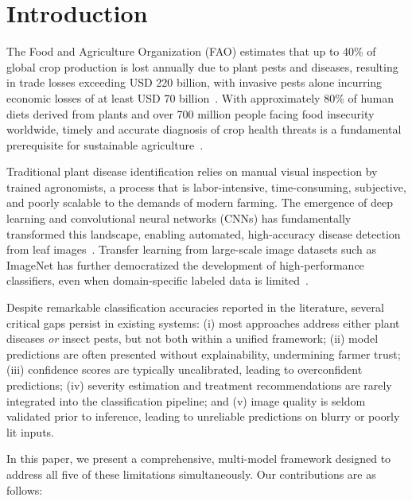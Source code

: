 \documentclass[conference]{IEEEtran}
\begin{document}
\section{Introduction}

The Food and Agriculture Organization (FAO) estimates that up to 40\% of global crop production is lost annually due to plant pests and diseases, resulting in trade losses exceeding USD 220 billion, with invasive pests alone incurring economic losses of at least USD 70 billion~\cite{fao2024}. With approximately 80\% of human diets derived from plants and over 700 million people facing food insecurity worldwide, timely and accurate diagnosis of crop health threats is a fundamental prerequisite for sustainable agriculture~\cite{fao2024, globalag2024}.

Traditional plant disease identification relies on manual visual inspection by trained agronomists, a process that is labor-intensive, time-consuming, subjective, and poorly scalable to the demands of modern farming. The emergence of deep learning and convolutional neural networks (CNNs) has fundamentally transformed this landscape, enabling automated, high-accuracy disease detection from leaf images~\cite{mohanty2016, ferentinos2018}. Transfer learning from large-scale image datasets such as ImageNet has further democratized the development of high-performance classifiers, even when domain-specific labeled data is limited~\cite{frontiers2024cotton}.

Despite remarkable classification accuracies reported in the literature, several critical gaps persist in existing systems: (i) most approaches address either plant diseases \textit{or} insect pests, but not both within a unified framework; (ii) model predictions are often presented without explainability, undermining farmer trust; (iii) confidence scores are typically uncalibrated, leading to overconfident predictions; (iv) severity estimation and treatment recommendations are rarely integrated into the classification pipeline; and (v) image quality is seldom validated prior to inference, leading to unreliable predictions on blurry or poorly lit inputs.

In this paper, we present a comprehensive, multi-model framework designed to address all five of these limitations simultaneously. Our contributions are as follows:
\end{document}
